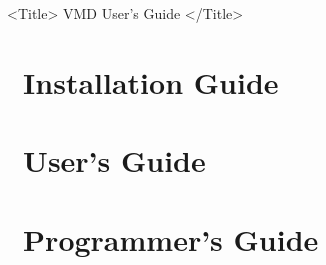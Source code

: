 
%
%
%

\oddsidemargin	0.5in
\evensidemargin	0in
\textheight	8.50in
\textwidth	6.00in
\marginparsep	0.25cm
\topmargin	0in
\headheight	0in
\headsep	0.5in
\footskip	0.5in
\footheight	0in


%
%



\begin{rawhtml}
  <Title> VMD User's Guide </Title>
\end{rawhtml}



\newcommand{\DOCTITLE} {Documentation Guides}
\newcommand{\DOCDESC} {
  This document includes the \VMD\ Installation, Users, and
Programmers Guides, which document how to obtain, install, use, and
modify the molecular graphics program \VMD.}

\newcommand{\vmdpart}[2] {
  \part{#1}
  
}



\vmdpart{\VMD\ Installation Guide}{ig_chapters}

\vmdpart{\VMD\ User's Guide}{ug_chapters}

\vmdpart{\VMD\ Programmer's Guide}{pg_chapters}




